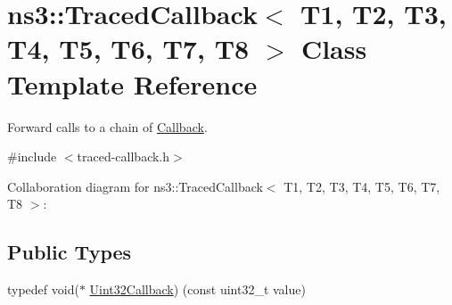 \hypertarget{classns3_1_1TracedCallback}{}\section{ns3\+:\+:Traced\+Callback$<$ T1, T2, T3, T4, T5, T6, T7, T8 $>$ Class Template Reference}
\label{classns3_1_1TracedCallback}


Forward calls to a chain of \hyperlink{classns3_1_1Callback}{Callback}.  




{\ttfamily \#include $<$traced-\/callback.\+h$>$}



Collaboration diagram for ns3\+:\+:Traced\+Callback$<$ T1, T2, T3, T4, T5, T6, T7, T8 $>$\+:
\subsection*{Public Types}
{\bf }\par
\begin{DoxyCompactItemize}
\item 
typedef void($\ast$ \hyperlink{classns3_1_1TracedCallback_add27924a9e14edd74e6315cabb657eb7}{Uint32\+Callback}) (const uint32\+\_\+t value)
\end{DoxyCompactItemize}

